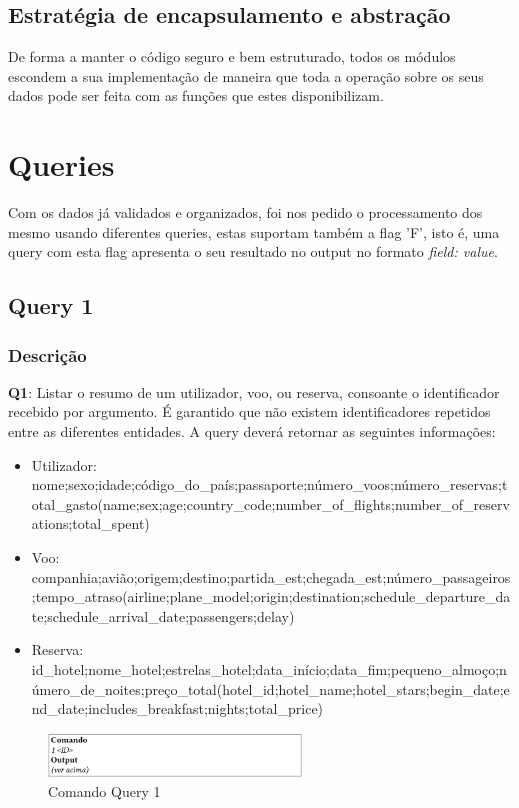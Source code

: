 \documentclass[11pt]{article}
\begin{document}
\subsection{Estratégia de encapsulamento e abstração}
De forma a manter o código seguro e bem estruturado, todos os módulos escondem a sua implementação de maneira que toda a operação sobre os seus dados pode ser feita com as funções que estes disponibilizam.

\newpage

\section{Queries}
Com os dados já validados e organizados, foi nos pedido o processamento dos mesmo usando diferentes queries, estas suportam também a flag 'F', isto é, uma query com esta flag apresenta o seu resultado no output no formato \textit{field: value}.

\subsection{Query 1}
\subsubsection{Descrição}
\textbf{Q1}: Listar o resumo de um utilizador, voo, ou reserva, consoante o identificador recebido por argumento. É garantido que não existem identificadores repetidos entre as diferentes entidades. A query deverá retornar as seguintes informações:
    \begin{itemize}
        \item Utilizador: nome;sexo;idade;código_do_país;passaporte;número_voos;número_reservas;total_gasto(name;sex;age;country_code;number_of_flights;number_of_reservations;total_spent)
        \item Voo:
companhia;avião;origem;destino;partida_est;chegada_est;número_passageiros;tempo_atraso(airline;plane_model;origin;destination;schedule_departure_date;schedule_arrival_date;passengers;delay)
        \item Reserva:
id_hotel;nome_hotel;estrelas_hotel;data_início;data_fim;pequeno_almoço;número_de_noites;preço_total(hotel_id;hotel_name;hotel_stars;begin_date;end_date;includes_breakfast;nights;total_price)
    \end{itemize}

    \begin{figure}[hbt!]
    \centering
    \includegraphics[width=0.6\textwidth]{comandq1.png}
    \caption{Comando Query 1}
    \label{fig:example}
\end{figure}
    
\end{document}
